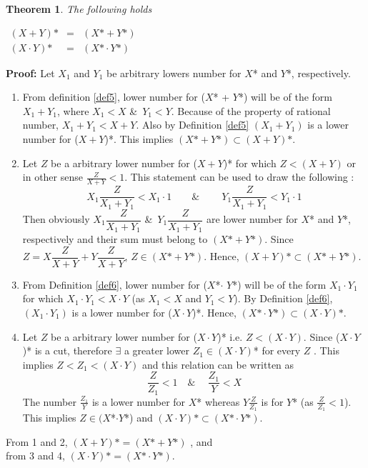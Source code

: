 \documentclass[12pt,a4paper,final,titlepage]{article}
\newtheorem{thm}{Theorem}
\begin{document}
\begin{thm} \label{thm12} The following holds

$
\begin{array}{rcl}
(X+Y)\text{*} & = & (X\text{*} + Y\text{*}) \\
(X\cdot Y)\text{*} & = & (X\text{*}\cdot Y\text{*})
\end{array}
$
\end{thm}
\textbf{Proof:} Let $X_1$ and $Y_1$ be arbitrary lowers number for $X$* and $Y$*, respectively.
\begin{enumerate}
\item From definition \ref{def5}, lower number for ($X$* + $Y$*) will be of the form $X_1+Y_1$, where $X_1<X$ \&\ $Y_1<Y$. Because of the property of rational number, $X_1+Y_1 < X+Y$. Also by Definition \ref{def5} $(X_1+Y_1)$ is a lower number for ($X+Y$)*. This implies $(X\text{*} + Y\text{*}) \subset (X+Y)\text{*}$.
\medskip
\item Let $Z$ be a arbitrary lower number for ($X+Y$)* for which $Z<(X+Y)$ or in other sense $\frac{Z}{X+Y}<1$. This statement can be used to draw the following :
\begin{equation}
X_1\dfrac{Z}{X_1+Y_1} < X_1\cdot1 \qquad \&\ \qquad Y_1\dfrac{Z}{X_1+Y_1} < Y_1\cdot1 \nonumber
\end{equation}
Then obviously $X_1\dfrac{Z}{X_1+Y_1}$ \&\ $Y_1\dfrac{Z}{X_1+Y_1}$ are lower number for $X$* and $Y$*, respectively and their sum must belong to $(X\text{*}+Y\text{*})$. Since $Z = X\dfrac{Z}{X+Y}+Y\dfrac{Z}{X+Y}$, $Z \in (X\text{*}+Y\text{*})$. Hence, $(X+Y)\text{*} \subset (X\text{*} + Y\text{*})$.
\medskip
\item From Definition \ref{def6}, lower number for ($X$*$\cdot$ $Y$*) will be of the form $X_1\cdot Y_1$ for which $X_1\cdot Y_1 < X\cdot Y$ (as $X_1<X$ and $Y_1<Y$). By Definition \ref{def6}, $(X_1\cdot Y_1)$ is a lower number for ($X\cdot Y$)*. Hence, $(X\text{*}\cdot Y\text{*}) \subset (X\cdot Y)\text{*}$.
\medskip
\item Let $Z$ be a arbitrary lower number for ($X\cdot Y$)* i.e. $Z<(X\cdot Y)$. Since ($X\cdot Y$)* is a cut, therefore $\exists$ a greater lower $Z_1\in (X\cdot Y)$* for every $Z$  . This implies  $Z<Z_1<(X\cdot Y)$ and this relation can be written as
\begin{equation}
\frac{Z}{Z_1} < 1 \quad \&\ \quad \frac{Z_1}{Y} < X \nonumber
\end{equation}
The number $\frac{Z_1}{Y}$ is a lower number for $X$* whereas $Y\frac{Z}{Z_1}$ is for $Y$* (as $\frac{Z}{Z_1} < 1$).
This implies $Z\in (X$*$\cdot Y$*) and $(X\cdot Y)\text{*} \subset (X\text{*}\cdot Y\text{*})$.
\end{enumerate}
From 1 and 2, $(X+Y)\text{*} = (X\text{*} + Y\text{*})$ , and \\
from 3 and 4, $(X\cdot Y)\text{*} = (X\text{*}\cdot Y\text{*})$.
\end{document}
